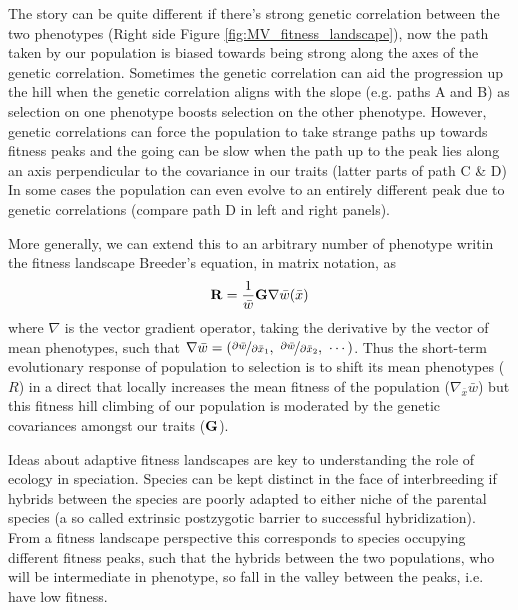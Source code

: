 The story can be quite different if there's strong genetic correlation
between the two phenotypes (Right side Figure
\ref{fig:MV_fitness_landscape}), now the path taken by our population
is biased towards being strong along the axes of the genetic
correlation. Sometimes the genetic correlation can aid the progression
up the hill when the genetic correlation aligns with the slope
(e.g. paths A and B) as
selection on one phenotype boosts selection on the other
phenotype. However, genetic correlations can force the population to
take strange paths up towards fitness peaks and the going can be slow
when the path up to the peak lies along an axis perpendicular to the
covariance in our traits (latter parts of path C \& D)
In some cases the population can even evolve to an entirely different
peak due to genetic correlations (compare path D in left and
right panels). 

More generally, we can extend this to an arbitrary number of phenotype
writin the fitness landscape Breeder's equation, in matrix notation, as 
\begin{equation}
{\bf R}  = \frac{1}{\bar{w}} {\bf G} \nabla \bar{w} ({\bar{x}})
\end{equation} 
where $\nabla$ is the vector gradient operator, taking the
derivative by the vector of mean phenotypes, such that
$\nabla \bar{w} =
\left( \nicefrac{\partial \bar{w}}{\partial \bar{x}_1},~
  \nicefrac{\partial \bar{w}}{\partial \bar{x}_2},~\cdots
\right)$. Thus the short-term evolutionary response of population to
selection is to shift its mean phenotypes ($R$) in a direct that
locally increases the mean fitness of the population
($\nabla_{\bar{x}} \bar{w}$) but this fitness hill climbing of our
population is moderated by the genetic covariances amongst our traits
(${\bf G}$).

Ideas about adaptive fitness landscapes are key to understanding the role of ecology in speciation. Species can be kept distinct in the face of interbreeding if hybrids between the species are poorly adapted to either niche of the parental species (a so called extrinsic postzygotic barrier to successful hybridization). From a fitness landscape perspective this corresponds to species occupying different fitness peaks, such that the hybrids between the two populations, who will be intermediate in phenotype, so fall in the valley between the peaks, i.e. have low fitness. 


